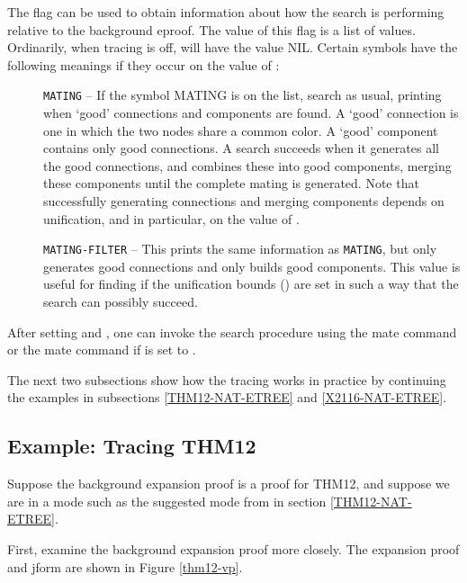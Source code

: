 The flag  can
be used to obtain information about how the search is performing
relative to the background eproof.  The value of this flag is a list of
values.  Ordinarily, when tracing is off, 
will have the value NIL.  Certain symbols have the following meanings
if they occur on the value of :

\begin{description}
\item[] {\tt MATING} -- If the symbol MATING is on the list,
search as usual, printing when `good' connections and components
are found.
A `good' connection is one in which the two nodes share a common color.
A `good' component contains only good connections.
A search succeeds when it generates all the good connections, and combines
these into good components, merging these components until the complete mating
is generated.  Note that successfully generating connections and merging components
depends on unification, and in particular, on the value of .

\item[] {\tt MATING-FILTER} -- This prints the same information as {\tt MATING}, but
only generates good connections and only builds good components.
This value is useful for finding if the unification bounds ()
are set in such a way that the search can possibly succeed.

\end{description}

After setting  and ,
one can invoke the search procedure  using
the mate command  or the mate command
 if  is set to .

The next two subsections show how the tracing works
in practice by continuing the examples in subsections
\ref{THM12-NAT-ETREE} and \ref{X2116-NAT-ETREE}.

\subsection{Example: Tracing THM12}\label{THM12-MS98-TRACE}

Suppose the background expansion proof is a proof for THM12,
and suppose we are in a mode such as the suggested mode
from  in section \ref{THM12-NAT-ETREE}.

First, examine the background expansion proof more closely.
The expansion proof and jform are shown in Figure \ref{thm12-vp}.

